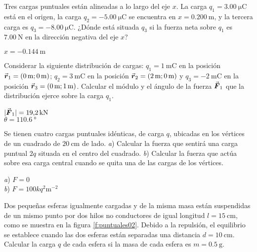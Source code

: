 %
\begin{Exercise}
  Tres cargas puntuales están alineadas a lo largo del eje $x$. La carga $q_1 = \SI{3.00}{\micro\coulomb}$ está en el origen, la carga $q_2 = \SI{-5.00}{\micro\coulomb}$ se encuentra en $x = \SI{0.200}{\metre}$, y la tercera carga es $q_3 = \SI{-8.00}{\micro\coulomb}$. ¿Dónde está situada $q_3$ si la fuerza neta sobre $q_1$ es $\SI{7.00}{\newton}$ en la dirección negativa del eje $x$?
\end{Exercise}
\begin{Answer}
  $x = \SI{-0.144}{\metre}$
\end{Answer}
%
\begin{Exercise}
  Considerar la siguiente distribución de cargas: $q_1 = \SI{1}{\milli\coulomb}$ en la posición $\va*{r}_1 = (\SI{0}{\metre};\SI{0}{\metre})$; $q_2 = \SI{3}{\milli\coulomb}$ en la posición $\va*{r}_2 = (\SI{2}{\metre};\SI{0}{\metre})$ y $q_3 = \SI{-2}{\milli\coulomb}$ en la posición $\va*{r}_3 = (\SI{0}{\metre};\SI{1}{\metre})$. Calcular el módulo y el ángulo de la fuerza $\va*{F}_1$ que la distribución ejerce sobre la carga $q_1$.
\end{Exercise}
\begin{Answer}
  \begin{minipage}[t]{.5\textwidth}
    $|\va*{F}_1| = \SI{19.2}{\kilo\newton}$\\ $\theta = \SI{110.6}{\degree}$
  \end{minipage}
\end{Answer}
%
\begin{Exercise}
  Se tienen cuatro cargas puntuales idénticas, de carga $q$, ubicadas en los vértices de un cuadrado de $\SI{20}{\centi\metre}$ de lado. \textit{a}) Calcular la fuerza que sentirá una carga puntual $2q$ situada en el centro del cuadrado. \textit{b}) Calcular la fuerza que actúa sobre esa carga central cuando se quita una de las cargas de los vértices.
\end{Exercise}
\begin{Answer}
  \begin{minipage}[t]{.5\textwidth}
    \textit{a}) $F = 0$\\ \textit{b}) $F = 100kq^2\si{\metre^{-2}}$
  \end{minipage}
\end{Answer}
%
\begin{Exercise}\label{p:puntuales02}
  Dos pequeñas esferas igualmente cargadas y de la misma masa están suspendidas de un mismo punto por dos hilos no conductores de igual longitud $l = \SI{15}{\centi\metre}$, como se muestra en la figura \ref{f:puntuales02}. Debido a la repulsión, el equilibrio se establece cuando las dos esferas están separadas una distancia $d = \SI{10}{\centi\metre}$. Calcular la carga $q$ de cada esfera si la masa de cada esfera es $m = \SI{0.5}{\gram}$.
\end{Exercise}
